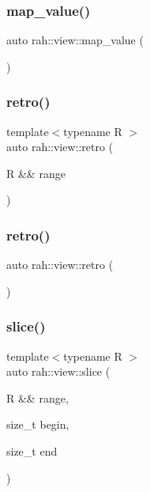 \subsubsection{\texorpdfstring{map\_value()}{map\_value()}\hspace{0.1cm}{\footnotesize\ttfamily [2/2]}}
{\footnotesize\ttfamily auto rah\+::view\+::map\+\_\+value (\begin{DoxyParamCaption}{ }\end{DoxyParamCaption})}

\mbox{\label{namespacerah_1_1view_ab7e756d22f9204231b4854b9deb51f6f}} 
\subsubsection{\texorpdfstring{retro()}{retro()}\hspace{0.1cm}{\footnotesize\ttfamily [1/2]}}
{\footnotesize\ttfamily template$<$typename R $>$ \\
auto rah\+::view\+::retro (\begin{DoxyParamCaption}\item[{R \&\&}]{range }\end{DoxyParamCaption})}

\mbox{\label{namespacerah_1_1view_a6c6543c61f1fb119394952a72c564753}} 
\subsubsection{\texorpdfstring{retro()}{retro()}\hspace{0.1cm}{\footnotesize\ttfamily [2/2]}}
{\footnotesize\ttfamily auto rah\+::view\+::retro (\begin{DoxyParamCaption}{ }\end{DoxyParamCaption})}

\mbox{\label{namespacerah_1_1view_ae4788f8f81a2830f39cf049cfa0faa87}} 
\subsubsection{\texorpdfstring{slice()}{slice()}\hspace{0.1cm}{\footnotesize\ttfamily [1/2]}}
{\footnotesize\ttfamily template$<$typename R $>$ \\
auto rah\+::view\+::slice (\begin{DoxyParamCaption}\item[{R \&\&}]{range,  }\item[{size\+\_\+t}]{begin,  }\item[{size\+\_\+t}]{end }\end{DoxyParamCaption})}


